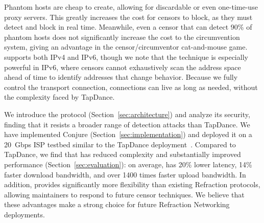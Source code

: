 \documentclass[sigconf,anonymous]{acmart}
\begin{document}
Phantom hosts are cheap to create, allowing for discardable or even one-time-use
proxy servers. This greatly increases the cost for censors to
block, as they must detect and block in real time. Meanwhile, even a censor that
can detect 90\% of phantom hosts does not significantly increase the cost to the
circumvention system, giving \scheme an advantage in the censor/circumventor
cat-and-mouse game.
\scheme supports both IPv4 and IPv6,
though we note that the technique is especially
powerful in IPv6, where censors cannot exhaustively scan the address space
ahead of time to identify addresses that change behavior.
Because we fully control the transport connection, connections can live as
long as needed, without the complexity faced by TapDance.




We introduce the \scheme protocol (Section~\ref{sec:architecture})
and analyze its security, finding that it resists a broader
range of detection attacks than TapDance.
We have implemented Conjure (Section~\ref{sec:implementation})
and deployed it on a 20~Gbps ISP testbed similar to the TapDance
deployment~\cite{frolov2017isp}.  Compared to TapDance, we find that
\scheme has reduced complexity and substantially improved performance
(Section~\ref{sec:evaluation}): on average, \scheme has 20\% lower latency,
14\% faster download bandwidth, and over 1400 times faster upload bandwidth.
In addition, \scheme provides significantly
more flexibility than existing Refraction protocols, allowing maintainers to
respond to future censor techniques.
We believe that these advantages
make \scheme a strong choice for future Refraction Networking deployments.

\end{document}

